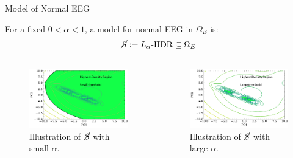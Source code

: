 \documentclass[t]{beamer}
\theoremstyle{definition}
\begin{document}
\begin{frame}{Model of Normal EEG}
    
    \begin{definition}
        For a fixed $0 < \alpha < 1$, a model for normal EEG in $\Omega_E$ is:
        $$\cancel{S} := L_\alpha\text{-HDR} \subseteq \Omega_E$$
    \end{definition}
    
    \begin{columns}[T] %
    \begin{column}{0.5 \textwidth}
    
        \begin{figure}
            \includegraphics[width=\textwidth]{figs/de_pc1_pc2_likelihood_hdr_small_threshold.pdf}
            \caption{Illustration of $\cancel{S}$ with small $\alpha$.}
        \end{figure}
    
    \end{column}    
    \begin{column}{0.5 \textwidth}
        \begin{figure}
            \includegraphics[width=\textwidth]{figs/de_pc1_pc2_likelihood_hdr_large_threshold.pdf}
            \caption{Illustration of $\cancel{S}$ with large $\alpha$.}
        \end{figure}
        

\end{column}
\end{columns}
\end{frame}
\end{document}
